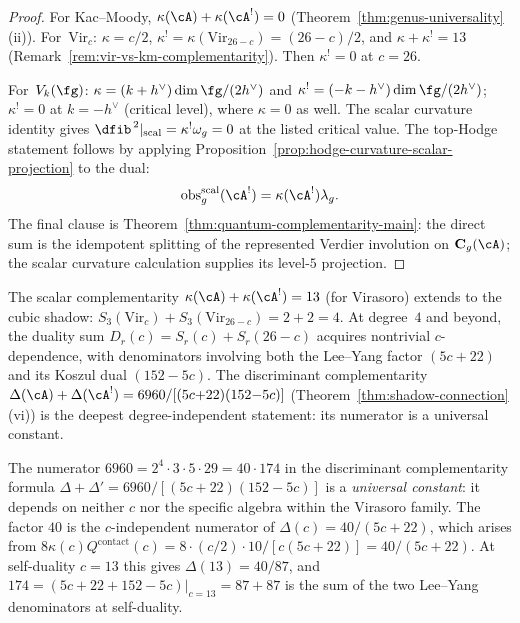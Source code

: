 \begin{proof}
For Kac--Moody, $\kappa(\cA) + \kappa(\cA^!) = 0$
(Theorem~\ref{thm:genus-universality}(ii)).
For~$\mathrm{Vir}_c$: $\kappa = c/2$,
$\kappa^! = \kappa(\mathrm{Vir}_{26-c}) = (26-c)/2$,
and $\kappa + \kappa^! = 13$
(Remark~\ref{rem:vir-vs-km-complementarity}).
Then $\kappa^! = 0$ at $c = 26$.

For~$V_k(\fg)$: $\kappa = (k+h^\vee)\dim\fg/(2h^\vee)$ and
$\kappa^! = (-k-h^\vee)\dim\fg/(2h^\vee)$; $\kappa^! = 0$
at $k = -h^\vee$ (critical level), where $\kappa = 0$ as well.
The scalar curvature identity gives
$\dfib^{\,2}|_{\mathrm{scal}}=\kappa^!\omega_g=0$ at the listed
critical value. The top-Hodge statement follows by applying
Proposition~\ref{prop:hodge-curvature-scalar-projection} to the dual:
\[
\operatorname{obs}^{\mathrm{scal}}_g(\cA^!)
=\kappa(\cA^!)\lambda_g.
\]
The final clause is Theorem~\ref{thm:quantum-complementarity-main}:
the direct sum is the idempotent splitting of the represented
Verdier involution on $\mathbf C_g(\cA)$; the scalar curvature
calculation supplies its level-$5$ projection.
\end{proof}

\begin{remark}
\label{rem:higher-degree-complementarity}
The scalar complementarity $\kappa(\cA) + \kappa(\cA^!) = 13$ (for Virasoro) extends to the cubic shadow: $S_3(\mathrm{Vir}_c) + S_3(\mathrm{Vir}_{26-c}) = 2 + 2 = 4$. At degree~$4$ and beyond, the duality sum $D_r(c) = S_r(c) + S_r(26{-}c)$ acquires nontrivial $c$-dependence, with denominators involving both the Lee--Yang factor $(5c{+}22)$ and its Koszul dual $(152{-}5c)$. The discriminant complementarity $\Delta(\cA) + \Delta(\cA^!) = 6960/[(5c{+}22)(152{-}5c)]$ (Theorem~\ref{thm:shadow-connection}(vi)) is the deepest degree-independent statement: its numerator is a universal constant.
\end{remark}

\begin{remark}
\label{rem:complementarity-numerator}
The numerator $6960 = 2^4 \cdot 3 \cdot 5 \cdot 29 = 40 \cdot 174$ in the discriminant complementarity formula $\Delta + \Delta' = 6960/[(5c{+}22)(152{-}5c)]$ is a \emph{universal constant}: it depends on neither $c$ nor the specific algebra within the Virasoro family. The factor $40$ is the $c$-independent numerator of $\Delta(c) = 40/(5c{+}22)$, which arises from $8\kappa(c) Q^{\mathrm{contact}}(c) = 8 \cdot (c/2) \cdot 10/[c(5c{+}22)] = 40/(5c{+}22)$. At self-duality $c = 13$ this gives $\Delta(13) = 40/87$, and $174 = (5c{+}22 + 152{-}5c)|_{c=13} = 87 + 87$ is the sum of the two Lee--Yang denominators at self-duality.
\end{remark}

